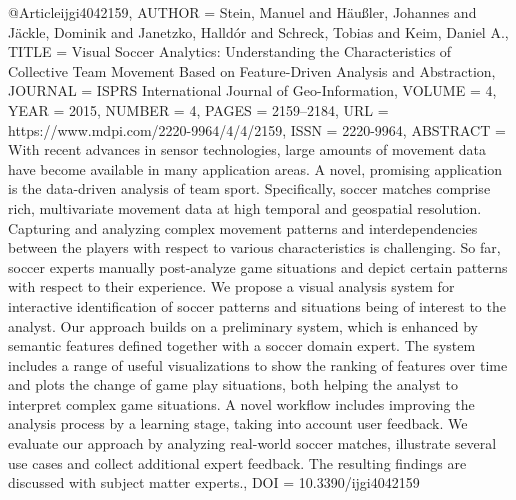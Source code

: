 
@Article{ijgi4042159,
AUTHOR = {Stein, Manuel and Häußler, Johannes and Jäckle, Dominik and Janetzko, Halldór and Schreck, Tobias and Keim, Daniel A.},
TITLE = {Visual Soccer Analytics: Understanding the Characteristics of Collective Team Movement Based on Feature-Driven Analysis and Abstraction},
JOURNAL = {ISPRS International Journal of Geo-Information},
VOLUME = {4},
YEAR = {2015},
NUMBER = {4},
PAGES = {2159--2184},
URL = {https://www.mdpi.com/2220-9964/4/4/2159},
ISSN = {2220-9964},
ABSTRACT = {With recent advances in sensor technologies, large amounts of movement data have become available in many application areas. A novel, promising application is the data-driven analysis of team sport. Specifically, soccer matches comprise rich, multivariate movement data at high temporal and geospatial resolution. Capturing and analyzing complex movement patterns and interdependencies between the players with respect to various characteristics is challenging. So far, soccer experts manually post-analyze game situations and depict certain patterns with respect to their experience. We propose a visual analysis system for interactive identification of soccer patterns and situations being of interest to the analyst. Our approach builds on a preliminary system, which is enhanced by semantic features defined together with a soccer domain expert. The system includes a range of useful visualizations to show the ranking of features over time and plots the change of game play situations, both helping the analyst to interpret complex game situations. A novel workflow includes improving the analysis process by a learning stage, taking into account user feedback. We evaluate our approach by analyzing real-world soccer matches, illustrate several use cases and collect additional expert feedback. The resulting findings are discussed with subject matter experts.},
DOI = {10.3390/ijgi4042159}
}



